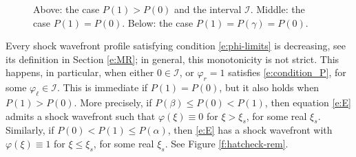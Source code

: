 \documentclass[11pt,a4paper]{article}
\renewcommand{\phi}{\varphi}
\begin{document}
\begin{figure}[htb]
\begin{center}

\end{center}
\caption{\label{f:=}{Above: the case $P(1)>P(0)$ and the interval $\mathcal{I}$. Middle: the case $P(1)=P(0)$. Below: the case $P(1)=P(\gamma)=P(0)$.}}
\end{figure}

Every shock wavefront profile satisfying condition \eqref{e:phi-limits} is decreasing, see its definition in Section \ref{e:MR}; in general, this monotonicity is not strict. This happens, in particular, when either $0 \in \mathcal I$, or $\varphi_r=1$ satisfies \eqref{e:condition_P}, for some $\varphi_\ell \in \mathcal I$. This is immediate if $P(1)=P(0)$, but it also holds  when $P(1)>P(0)$. More precisely, if $P(\beta)\le P(0)<P(1)$, then equation \eqref{e:E} admits a shock wavefront such that $\phi(\xi)\equiv0$ for $\xi > \xi_s$, for some real $\xi_s$. Similarly, if $P(0)<P(1)\le P(\alpha)$, then \eqref{e:E} has a shock wavefront with $\phi(\xi)\equiv1$ for $\xi \le \xi_s$, for some real $\xi_s$. See Figure \ref{f:hatcheck-rem}. 
\end{document}
